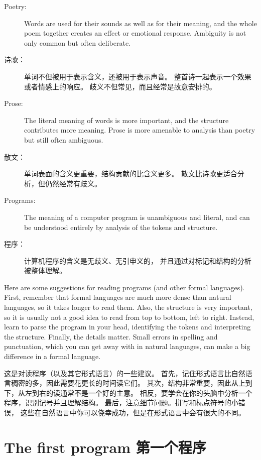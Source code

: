 \documentclass[10pt]{book}
\begin{document}
\begin{CJK}{UTF8}{gbsn}
\begin{description}
\item[Poetry:] Words are used for their sounds as well as for
their meaning, and the whole poem together creates an effect or
emotional response.  Ambiguity is not only common but often
deliberate.

\item[诗歌：] 单词不但被用于表示含义，还被用于表示声音。
整首诗一起表示一个效果或者情感上的响应。
歧义不但常见，而且经常是故意安排的。

\item[Prose:] The literal meaning of words is more important,
and the structure contributes more meaning.  Prose is more amenable to
analysis than poetry but still often ambiguous.

\item[散文：] 单词表面的含义更重要，结构贡献的比含义更多。
散文比诗歌更适合分析，但仍然经常有歧义。

\item[Programs:] The meaning of a computer program is unambiguous
and literal, and can be understood entirely by analysis of the
tokens and structure.

\item[程序：] 计算机程序的含义是无歧义、无引申义的，
并且通过对标记和结构的分析被整体理解。

\end{description}

Here are some suggestions for reading programs (and other formal
languages).  First, remember that formal languages are much more dense
than natural languages, so it takes longer to read them.  Also, the
structure is very important, so it is usually not a good idea to read
from top to bottom, left to right.  Instead, learn to parse the
program in your head, identifying the tokens and interpreting the
structure.  Finally, the details matter.  Small errors in
spelling and punctuation, which you can get away
with in natural languages, can make a big difference in a formal
language.

这是对读程序（以及其它形式语言）的一些建议。
首先，记住形式语言比自然语言稠密的多，因此需要花更长的时间读它们。
其次，结构非常重要，因此从上到下，从左到右的读通常不是一个好的主意。
相反，要学会在你的头脑中分析一个程序，识别记号并且理解结构。
最后，注意细节问题。拼写和标点符号的小错误，
这些在自然语言中你可以侥幸成功，但是在形式语言中会有很大的不同。

\section{The first program 第一个程序}
\label{hello}


\end{CJK}
\end{document}
